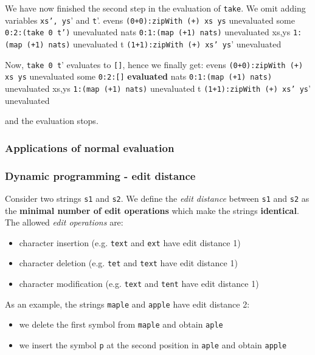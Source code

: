 We have now finished the second step in the evaluation of \texttt{take}. We omit adding variables \texttt{xs', ys}' and \texttt{t}'.
\textbar evens \textbar \texttt{(0+0):zipWith (+) xs ys} \textbar unevaluated \textbar
\textbar some \textbar \texttt{0:2:(take 0 t')} \textbar unevaluated \textbar
\textbar nats \textbar \texttt{0:1:(map (+1) nats)} \textbar unevaluated \textbar
\textbar xs,ys \textbar \texttt{1:(map (+1) nats)} \textbar unevaluated \textbar
\textbar t \textbar \texttt{(1+1):zipWith (+) xs' ys}' \textbar unevaluated \textbar

Now, \texttt{take 0 t}' evaluates to \texttt{[]}, hence we finally get:
\textbar evens \textbar \texttt{(0+0):zipWith (+) xs ys} \textbar unevaluated \textbar
\textbar some \textbar \texttt{0:2:[]} \textbar \textbf{evaluated} \textbar
\textbar nats \textbar \texttt{0:1:(map (+1) nats)} \textbar unevaluated \textbar
\textbar xs,ys \textbar \texttt{1:(map (+1) nats)} \textbar unevaluated \textbar
\textbar t \textbar \texttt{(1+1):zipWith (+) xs' ys}' \textbar unevaluated \textbar

and the evaluation stops. 

\subsubsection*{ Applications of normal evaluation }

\subsubsection*{ Dynamic programming - edit distance }

Consider two strings \texttt{s1} and \texttt{s2}. We define the \textit{edit distance} between \texttt{s1} and \texttt{s2} as the \textbf{minimal number of edit operations} which make the strings \textbf{identical}. The allowed \textit{edit operations} are:
\begin{itemize}
	\item  character insertion (e.g. \texttt{text} and \texttt{ext} have edit distance 1)
	\item  character deletion (e.g. \texttt{tet} and \texttt{text} have edit distance 1)
	\item  character modification (e.g. \texttt{text} and \texttt{tent} have edit distance 1)
\end{itemize}

As an example, the strings \texttt{maple} and \texttt{apple} have edit distance 2:
\begin{itemize}
	\item  we delete the first symbol from \texttt{maple} and obtain \texttt{aple}
	\item  we insert the symbol \texttt{p} at the second position in \texttt{aple} and obtain \texttt{apple}
\end{itemize}

